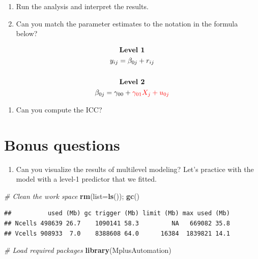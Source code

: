 \documentclass[
]{book}
\newenvironment{Shaded}{\begin{snugshade}}{\end{snugshade}}
\newcommand{\AttributeTok}[1]{\textcolor[rgb]{0.13,0.29,0.53}{#1}}
\newcommand{\CommentTok}[1]{\textcolor[rgb]{0.56,0.35,0.01}{\textit{#1}}}
\newcommand{\FunctionTok}[1]{\textcolor[rgb]{0.13,0.29,0.53}{\textbf{#1}}}
\newcommand{\NormalTok}[1]{#1}
\providecommand{\tightlist}{%
  \setlength{\itemsep}{0pt}\setlength{\parskip}{0pt}}
\begin{document}
\begin{enumerate}
\def\labelenumi{\arabic{enumi}.}
\setcounter{enumi}{1}
\item
  Run the analysis and interpret the results.
\item
  Can you match the parameter estimates to the notation in the formula below?
\end{enumerate}

\[
\begin{gathered}
\textbf{Level 1} \\
y_{ij}=\beta_{0j} + r_{ij} \\ \\
\textbf{Level 2} \\
\beta_{0j}=\gamma_{00} + \color{red}{\gamma_{01}X_{j}} + u_{0j}
\end{gathered}
\]

\begin{enumerate}
\def\labelenumi{\arabic{enumi}.}
\setcounter{enumi}{3}
\tightlist
\item
  Can you compute the ICC?
\end{enumerate}

\hypertarget{bonus-questions-3}{%
\section{Bonus questions}\label{bonus-questions-3}}

\begin{enumerate}
\def\labelenumi{\arabic{enumi}.}
\tightlist
\item
  Can you visualize the results of multilevel modeling? Let's practice with the model with a level-1 predictor that we fitted.
\end{enumerate}

\begin{Shaded}
\begin{Highlighting}[]
\CommentTok{\# Clean the work space}
\FunctionTok{rm}\NormalTok{(}\AttributeTok{list=}\FunctionTok{ls}\NormalTok{()); }\FunctionTok{gc}\NormalTok{()}
\end{Highlighting}
\end{Shaded}

\begin{verbatim}
##          used (Mb) gc trigger (Mb) limit (Mb) max used (Mb)
## Ncells 498639 26.7    1090141 58.3         NA   669082 35.8
## Vcells 908933  7.0    8388608 64.0      16384  1839821 14.1
\end{verbatim}

\begin{Shaded}
\begin{Highlighting}[]
\CommentTok{\# Load required packages}
\FunctionTok{library}\NormalTok{(MplusAutomation)}
\end{Highlighting}
\end{Shaded}
\end{document}
